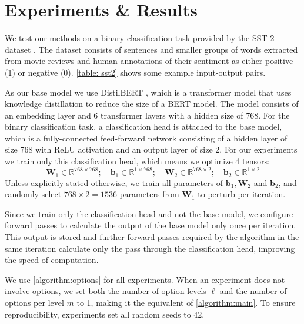 \chapter{Experiments \& Results}
We test our methods on a binary classification task
provided by the SST-2 dataset \parencite{sst2}. 
The dataset consists of
sentences and smaller groups of words
extracted from movie reviews and 
human annotations of their sentiment as either 
positive (1) or negative (0). \autoref{table: sst2} 
shows some example input-output pairs. 

As our base model we use DistilBERT \parencite{distilbert},
which is a transformer model that 
uses knowledge distillation to reduce the size of a 
BERT model. The model consists of an embedding layer 
and 6 transformer layers with a hidden size of 768. 
For the binary classification task, a classification head
is attached to the base model, which is a fully-connected
feed-forward network consisting of a hidden layer of 
size 768 with \ac{ReLU} activation 
and an output layer of size 2. For our experiments we 
train only this classification head, which means we 
optimize 4 tensors: 
\begin{equation*}
    \mathbf{W}_1 \in \mathbb{R}^{768\times768};\quad 
    \mathbf{b}_1 \in \mathbb{R}^{1\times768};\quad 
    \mathbf{W}_2 \in \mathbb{R}^{768\times2};\quad 
    \mathbf{b}_2 \in \mathbb{R}^{1\times2}
\end{equation*}
Unless explicitly stated otherwise, we train all 
parameters of $\mathbf{b}_1, \mathbf{W}_2$ and 
$\mathbf{b}_2$, and randomly 
select $768\times2=1536$ parameters 
from $\mathbf{W}_1$ to perturb per iteration. 

Since we train only the classification head and not the
base model, we configure forward passes to calculate 
the output of the base model only once per iteration. 
This output is stored and further forward passes 
required by the algorithm in the same iteration 
calculate only the pass through the classification head,
improving the speed of computation.

We use \autoref{algorithm:options} for all experiments.
When an experiment does not involve options, we set 
both the number of option
levels $\ell$ and the number of options per level $m$ 
to 1, making it the equivalent of \autoref{algorithm:main}.
To ensure reproducibility, experiments set all 
random seeds to $42$. 

